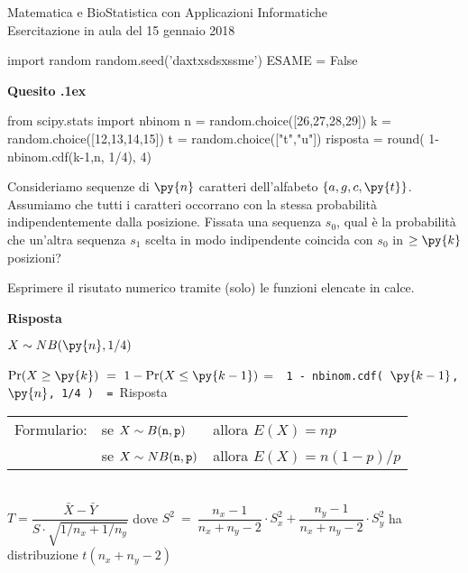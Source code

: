 \documentclass[11pt,twoside,a4paper]{article}
\newcounter{quesito}
\newenvironment{question}{\addtocounter{quesito}{1}\par\textbf{Quesito \thequesito.\kern1ex}}{\vspace{0.5\parskip}}
\newenvironment{answer}{\par\textbf{Risposta\quad}}{\vspace{\parskip}}
\begin{document}
\colorbox{blue!10}{\begin{minipage}{\textwidth}
Matematica e BioStatistica con Applicazioni Informatiche\\
Esercitazione in aula del 15 gennaio 2018
\end{minipage}}



\begin{pycode}
import random
random.seed('daxtxsdsxssme')
ESAME = False
\end{pycode}

\begin{question}
\begin{pycode}
from scipy.stats import nbinom
n = random.choice([26,27,28,29])
k = random.choice([12,13,14,15])
t = random.choice(["t","u"])
risposta = round( 1- nbinom.cdf(k-1,n, 1/4), 4)
\end{pycode}
Consideriamo sequenze di $\py{n}$ caratteri dell'alfabeto $\{a,g,c,\py{t}\}$. 
Assumiamo che tutti i caratteri occorrano con la stessa probabilità indipendentemente dalla posizione.
Fissata una sequenza $s_0$, qual è la probabilità che un'altra sequenza $s_1$ 
scelta in modo indipendente coincida con $s_0$ in $\ge\py{k}$ posizioni?   

Esprimere il risutato numerico tramite (solo) le funzioni elencate in calce.
\begin{answer}
    
  $X\sim NB(\py{n}, 1/4)$
  
  $\Pr(X\ge \py{k})\ =\ 1-\Pr(X\le \py{k-1})$
  \quad =\ 
  {\tt{\color{blue}  1 -  nbinom.cdf( $\py{k-1}$, $\py{n}$, 1/4 )}
  \ =\ 
  \py{risposta}}{\color{blue}\hfill Risposta}
\end{answer}
\end{question}


\vfill\hrulefill\par
\begin{tabular}{@{}lll}
Formulario:& se $X\sim B({\tt n},{\tt p})$ & allora $E(X)=np$\\
           & se $X\sim NB({\tt n},{\tt p})$& allora $E(X)=n(1-p)/p$\\
\end{tabular}
\\[1ex]
$T=\dfrac{\bar X-\bar Y}{S\cdot\sqrt{1/n_x+1/n_y}}$
\hfill dove
$S^2\ =\ \dfrac{n_x-1}{n_x+n_y-2}\cdot S_x^2 + \dfrac{n_y-1}{n_x+n_y-2}\cdot S_y^2$
\hfill
ha distribuzione $t(n_x+n_y-2)$\\
\end{document}
